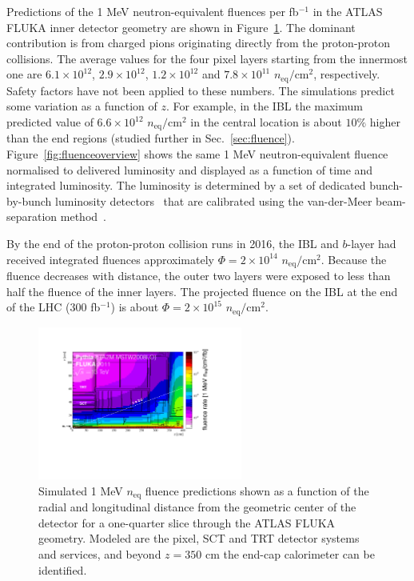 Predictions of the 1 MeV neutron-equivalent fluences per fb$^{-1}$ in the ATLAS FLUKA inner detector 
geometry are shown in Figure~\ref{fig:fluenceoverview2}. The dominant contribution is from charged 
pions originating directly from the proton-proton collisions. The average values for the four pixel layers 
starting from the innermost one are $6.1\times 10^{12}$, $2.9\times 10^{12}$, $1.2\times 10^{12}$ 
and $7.8\times 10^{11}$ $n_\text{eq}/\text{cm}^2$, respectively. Safety factors have not been applied to 
these numbers.  The simulations predict some variation as a function of $z$.  For example, in the IBL 
the maximum predicted value of $6.6\times 10^{12}$ $n_\text{eq}/\text{cm}^2$ in the central location is 
about $10\%$ higher than the end regions (studied further in Sec.~\ref{sec:fluence}). 
Figure~\ref{fig:fluenceoverview} shows the same 1 MeV neutron-equivalent fluence normalised to 
delivered luminosity and displayed as a function of time and integrated luminosity. The luminosity is 
determined by a set of dedicated bunch-by-bunch luminosity detectors~\cite{Aaboud:2016hhf} that are 
calibrated using the van-der-Meer beam-separation method~\cite{vanderMeer:296752}.

By the end of the proton-proton collision runs in 2016, the IBL and $b$-layer had received integrated 
fluences approximately $\Phi=2\times 10^{14}$ $n_\text{eq}/\text{cm}^{2}$. Because the fluence 
decreases with distance, the outer two layers were exposed to less than half the fluence of the inner 
layers. The projected fluence on the IBL at the end of the LHC (300 fb$^{-1}$) is about 
$\Phi=2\times 10^{15}$ $n_\text{eq}/\text{cm}^{2}$. 

\begin{figure}[htpb!]
\centering
\includegraphics[width=0.6\textwidth]{Labeled2.pdf}
\caption{Simulated 1 MeV $n_\text{eq}$ fluence predictions shown as a function of the radial and longitudinal distance from the geometric center of the detector for a one-quarter slice through the ATLAS FLUKA geometry. Modeled are the pixel, SCT and TRT detector systems and services, and beyond $z = 350$ cm the end-cap calorimeter can be identified.}
\label{fig:fluenceoverview2}
\end{figure}

